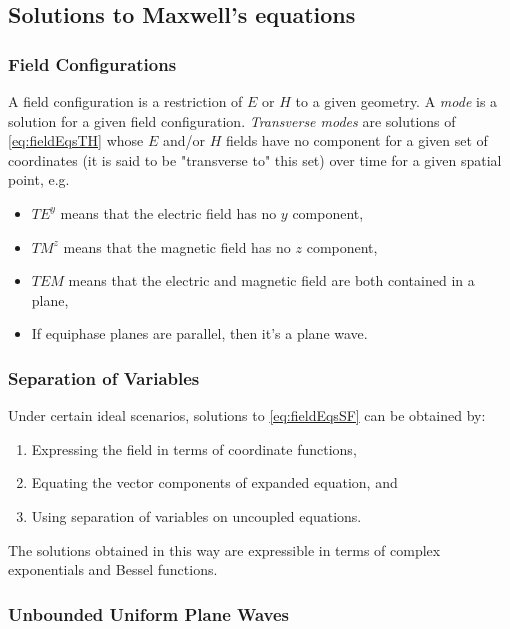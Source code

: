\documentclass{article}
\numberwithin{equation}{section}
\begin{document}
    \subsection{Solutions to Maxwell's equations}
        \subsubsection{Field Configurations}
            A field configuration is a restriction of $E$ or $H$ to a given geometry. A
            \emph{mode} is a solution for a given field configuration. \emph{Transverse
            modes} are solutions of \eqref{eq:fieldEqsTH} whose $E$ and/or $H$ fields
            have no component for a given set of coordinates (it is said to be
            "transverse to" this set) over time for a given spatial point, e.g.
            \begin{itemize}
                \item $TE^y$ means that the electric field has no $y$ component,
                \item $TM^z$ means that the magnetic field has no $z$ component,
                \item $TEM$ means that the electric and magnetic field are both
                    contained in a plane,
                \item If equiphase planes are parallel, then it's a plane wave.
            \end{itemize}
        \subsubsection{Separation of Variables}
            Under certain ideal scenarios, solutions to \eqref{eq:fieldEqsSF} can be
            obtained by:
            \begin{enumerate}
                \item Expressing the field in terms of coordinate functions,
                \item Equating the vector components of expanded equation, and
                \item Using separation of variables on uncoupled equations.
            \end{enumerate}
            The solutions obtained in this way are expressible in terms of complex
            exponentials and Bessel functions.
        \subsubsection{Unbounded Uniform Plane Waves}
\end{document}
